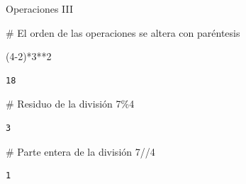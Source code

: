 \documentclass[
  ignorenonframetext,
  aspectratio=169,
  spanish,
]{beamer}
\newenvironment{Shaded}{\begin{snugshade}}{\end{snugshade}}
\newcommand{\CommentTok}[1]{\textcolor[rgb]{0.37,0.37,0.37}{#1}}
\newcommand{\DecValTok}[1]{\textcolor[rgb]{0.68,0.00,0.00}{#1}}
\newcommand{\NormalTok}[1]{\textcolor[rgb]{0.00,0.23,0.31}{#1}}
\newcommand{\OperatorTok}[1]{\textcolor[rgb]{0.37,0.37,0.37}{#1}}
\begin{document}
\begin{frame}[fragile]{Operaciones III}
\label{operaciones-iii}
\begin{Shaded}
\begin{Highlighting}[]
\CommentTok{\# El orden de las operaciones se altera con paréntesis }

\NormalTok{(}\DecValTok{4}\OperatorTok{{-}}\DecValTok{2}\NormalTok{)}\OperatorTok{*}\DecValTok{3}\OperatorTok{**}\DecValTok{2} 
\end{Highlighting}
\end{Shaded}

\begin{verbatim}
18
\end{verbatim}

\begin{Shaded}
\begin{Highlighting}[]
\CommentTok{\# Residuo de la división}
\DecValTok{7}\OperatorTok{\%}\DecValTok{4}
\end{Highlighting}
\end{Shaded}

\begin{verbatim}
3
\end{verbatim}

\begin{Shaded}
\begin{Highlighting}[]
\CommentTok{\# Parte entera de la división }
\DecValTok{7}\OperatorTok{//}\DecValTok{4}
\end{Highlighting}
\end{Shaded}

\begin{verbatim}
1
\end{verbatim}
\end{frame}
\end{document}
